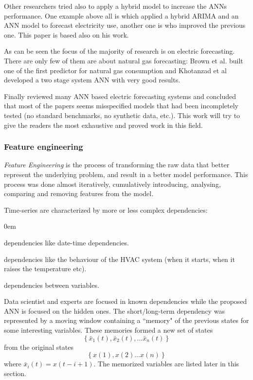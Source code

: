 \documentclass{sig-alternate-sigmod07}
\begin{document}
Other researchers tried also to apply a hybrid model to increase the ANNs performance. One example above all is \cite{zhang2003time} which applied a hybrid ARIMA and an ANN model to forecast electricity use, another one is \cite{khashei2010artificial} who improved the previous one. This paper is based also on his work.

As can be seen the focus of the majority of research is on electric forecasting. There are only few of them are about natural gas forecasting: Brown et al.\cite{brown1995development} built one of the first predictor for natural gas consumption and Khotanzad et al \cite{khotanzad2000combination} developed a two stage system ANN with very good results. 

Finally \cite{hippert2001neural} reviewed many ANN based electric forecasting systems and concluded that most of the papers seems misspecified models that had been incompletely tested (no standard benchmarks, no synthetic data, etc.). This work will try to give the readers the most exhaustive and proved work in this field. 




\subsubsection{Feature engineering}

\emph{Feature Engineering} is the process of transforming the raw data that better represent the underlying problem, and result in a better model performance. This process was done almost iteratively, cumulatively introducing, analysing, comparing and removing features from the model.

Time-series are characterized by more or less complex dependencies:
\begin{description}[font=\normalfont\itshape,leftmargin=1pc]
\itemsep0em
  \item[Known] dependencies like date-time dependencies.
  \item[Hidden] dependencies like the behaviour of the HVAC system (when it starts, when it raises the temperature etc).
  \item[Short/long-term] dependencies between variables.
\end{description}
Data scientist and experts are focused in known dependencies while the proposed ANN is focused on the hidden ones.
The short/long-term dependency was represented by a moving window containing a ``memory" of the previous states for some interesting variables. These memories formed a new set of states \begin{displaymath}\left\{\bar{x}_1(t), \bar{x}_2(t), \ldots \bar{x}_n(t)\right\}\end{displaymath} from the original states \begin{displaymath}\left\{x(1), x(2) \ldots x(n)\right\}\end{displaymath} where $\bar{x}_i(t) = x(t - i + 1)$. The memorized variables are listed later in this section. 
\end{document}
